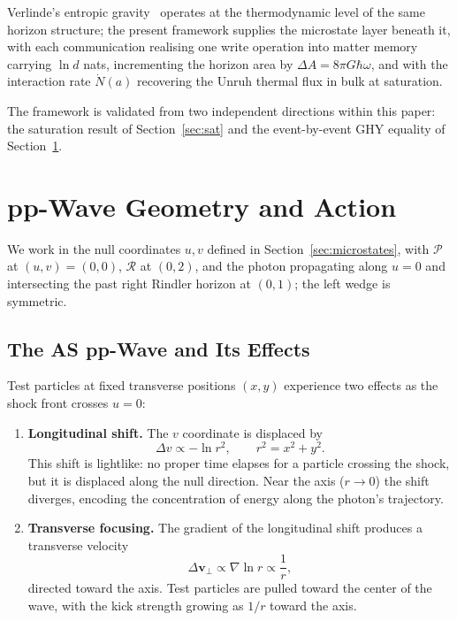 \documentclass[12pt,a4paper]{article}
\begin{document}
Verlinde's entropic gravity~\cite{entropic} operates 
at the thermodynamic level of the same horizon 
structure; the present framework supplies the 
microstate layer beneath it, with each communication 
realising one write operation into matter memory 
carrying $\ln d$ nats, incrementing the horizon 
area by $\Delta A = 8\pi G\hbar\omega$, and with 
the interaction rate $\dot{N}(a)$ recovering the 
Unruh thermal flux in bulk at saturation.

The framework is validated from two independent directions 
within this paper: the saturation result of 
Section~\ref{sec:sat} and the event-by-event GHY equality 
of Section~\ref{sec:ppwave}. 

\section{pp-Wave Geometry and Action}
\label{sec:ppwave}

We work in the null coordinates $u, v$ defined 
in Section~\ref{sec:microstates}, with $\mathcal{P}$ 
at $(u,v) = (0,0)$, $\mathcal{R}$ at $(0,2)$, and 
the photon propagating along $u = 0$ and intersecting 
the past right Rindler horizon at $(0,1)$; 
the left wedge is symmetric.
 
\subsection{The AS pp-Wave and Its Effects}

Test particles at fixed transverse positions $(x,y)$ experience two effects as the shock front crosses $u = 0$:

\begin{enumerate}
    \item \textbf{Longitudinal shift.} The $v$ coordinate is displaced by
    \begin{equation}
    \Delta v \propto -\ln r^2, \qquad r^2 = x^2 + y^2.
    \end{equation}
    This shift is lightlike: no proper time elapses for a particle crossing the shock, but it is displaced along the null direction. Near the axis ($r \to 0$) the shift diverges, encoding the concentration of energy along the photon's trajectory.

    \item \textbf{Transverse focusing.} The gradient of the longitudinal shift produces a transverse velocity
    \begin{equation}
    \Delta \mathbf{v}_\perp \propto \nabla \ln r \propto \frac{1}{r},
    \end{equation}
    directed toward the axis. Test particles are pulled toward the center of the 
wave, with the kick strength growing as $1/r$ toward the axis.
\end{enumerate}
\end{document}
